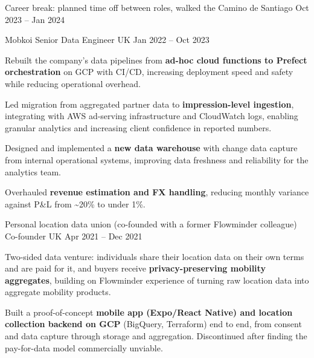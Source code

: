 \begin{cventries}
  \cventry
    {Career break: planned time off between roles, walked the Camino de Santiago}
    {}
    {} %
    {Oct 2023 -- Jan 2024} %
    {}
  \vspace{3mm}

  \cventry
    {Mobkoi}
    {Senior Data Engineer}
    {UK} %
    {Jan 2022 -- Oct 2023} %
    {
      \begin{cvitems} %
        \item {Rebuilt the company's data pipelines from \textbf{ad-hoc cloud functions to Prefect orchestration} on GCP with CI/CD, increasing deployment speed and safety while reducing operational overhead.}
        \item {Led migration from aggregated partner data to \textbf{impression-level ingestion}, integrating with AWS ad-serving infrastructure and CloudWatch logs, enabling granular analytics and increasing client confidence in reported numbers.}
        \item {Designed and implemented a \textbf{new data warehouse} with change data capture from internal operational systems, improving data freshness and reliability for the analytics team.}
        \item {Overhauled \textbf{revenue estimation and FX handling}, reducing monthly variance against P\&L from \textasciitilde 20\% to under 1\%.}
      \end{cvitems}
    }

  \cventry
    {Personal location data union (co-founded with a former Flowminder colleague)}
    {Co-founder}
    {UK} %
    {Apr 2021 -- Dec 2021} %
    {
      \begin{cvitems}
        \item {Two-sided data venture: individuals share their location data on their own terms and are paid for it, and buyers receive \textbf{privacy-preserving mobility aggregates}, building on Flowminder experience of turning raw location data into aggregate mobility products.}
        \item {Built a proof-of-concept \textbf{mobile app (Expo/React Native) and location collection backend on GCP} (BigQuery, Terraform) end to end, from consent and data capture through storage and aggregation. Discontinued after finding the pay-for-data model commercially unviable.}
      \end{cvitems}
    }


\end{cventries}
